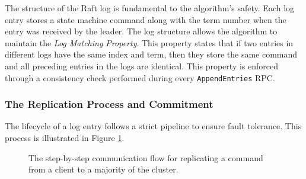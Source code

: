 The structure of the Raft log is fundamental to the algorithm's safety.
Each log entry stores a state machine command along with the term number when the entry was received by the leader.
The log structure allows the algorithm to maintain the \textit{Log Matching Property}. This property states that if two entries in different logs have the same index and term, then they store the same command and all preceding entries in the logs are identical. This property is enforced through a consistency check performed during every \texttt{AppendEntries} RPC.

\subsubsection{The Replication Process and Commitment}
The lifecycle of a log entry follows a strict pipeline to ensure fault tolerance. This process is illustrated in Figure \ref{fig:replication_flow}.

\begin{figure}[h]
    \centering
    \caption{The step-by-step communication flow for replicating a command from a client to a majority of the cluster.}
    \label{fig:replication_flow}
\end{figure}

